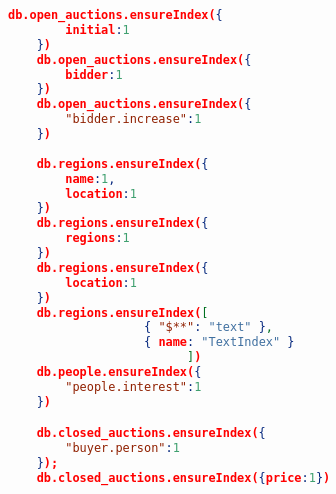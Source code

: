 \noindent\makebox[\linewidth]{\rule{\paperwidth}{0.4pt}}
\begin{lstlisting}[language=JSON,   basicstyle=\scriptsize, label=mongodb-xmark-index, caption=Secondary indexes in MongoDB's XMark data]
	  db.open_auctions.ensureIndex({
		initial:1
	})
	db.open_auctions.ensureIndex({
		bidder:1
	})
	db.open_auctions.ensureIndex({
		"bidder.increase":1
	})
	
	db.regions.ensureIndex({
		name:1,
		location:1
	})
	db.regions.ensureIndex({
		regions:1
	})
	db.regions.ensureIndex({
		location:1
	})
	db.regions.ensureIndex([
                   { "$**": "text" },
                   { name: "TextIndex" }
                         ])
	db.people.ensureIndex({
		"people.interest":1
	})

	db.closed_auctions.ensureIndex({
		"buyer.person":1
	});
	db.closed_auctions.ensureIndex({price:1})
	\end{lstlisting}
